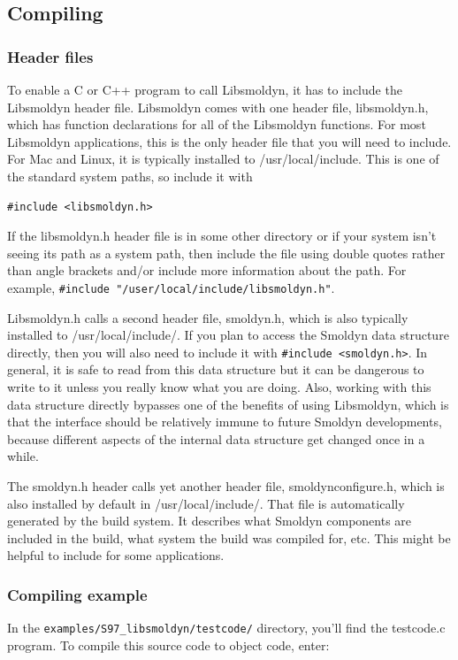 \documentclass {scrbook}
\newcommand {\ttt} {\texttt}
\begin{document}
\subsection*{Compiling}

\subsubsection*{Header files}
To enable a C or C++ program to call Libsmoldyn, it has to include the Libsmoldyn header file. Libsmoldyn comes with one header file, libsmoldyn.h, which has function declarations for all of the Libsmoldyn functions. For most Libsmoldyn applications, this is the only header file that you will need to include. For Mac and Linux, it is typically installed to /usr/local/include. This is one of the standard system paths, so include it with

\begin{lstlisting}[style=SSAC]
#include <libsmoldyn.h>
\end{lstlisting}

If the libsmoldyn.h header file is in some other directory or if your system isn't seeing its path as a system path, then include the file using double quotes rather than angle brackets and/or include more information about the path. For example, \lstinline{#include "/user/local/include/libsmoldyn.h"}.

Libsmoldyn.h calls a second header file, smoldyn.h, which is also typically installed to /usr/local/include/. If you plan to access the Smoldyn data structure directly, then you will also need to include it with \lstinline{#include <smoldyn.h>}. In general, it is safe to read from this data structure but it can be dangerous to write to it unless you really know what you are doing. Also, working with this data structure directly bypasses one of the benefits of using Libsmoldyn, which is that the interface should be relatively immune to future Smoldyn developments, because different aspects of the internal data structure get changed once in a while.

The smoldyn.h header calls yet another header file, smoldynconfigure.h, which is also installed by default in /usr/local/include/. That file is automatically generated by the build system. It describes what Smoldyn components are included in the build, what system the build was compiled for, etc. This might be helpful to include for some applications.

\subsubsection*{Compiling example}
In the \ttt{examples/S97\_libsmoldyn/testcode/} directory, you'll find the testcode.c program. To compile this source code to object code, enter:
\end{document}
